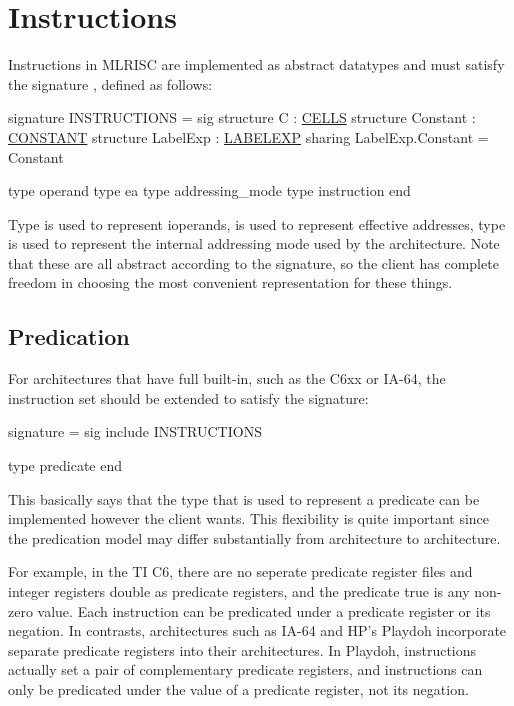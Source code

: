 \section{Instructions}

  Instructions in MLRISC are implemented as abstract datatypes and
must satisfy the signature 
, defined as follows:

\begin{SML}
signature INSTRUCTIONS =
sig
   structure C        : \href{cells.html}{CELLS}
   structure Constant : \href{constants.html}{CONSTANT}
   structure LabelExp : \href{labelexp.html}{LABELEXP}
      sharing LabelExp.Constant = Constant

   type operand   
   type ea         
   type addressing_mode
   type instruction 
end
\end{SML}

Type  is used to represent ioperands,
 is used to represent effective addresses, type 
 is used to represent the internal addressing mode
used by the architecture.  Note that these are all abstract according to 
the signature, so the client has complete freedom in choosing the most
convenient representation for these things.

\subsection{Predication}
   For architectures that have full 
built-in, such as the C6xx or IA-64, the instruction set should be
extended to satisfy the signature: 
\begin{SML}
signature  =
sig
   include INSTRUCTIONS
   
   type predicate  
end
\end{SML}
This basically says that the type that is used to represent a predicate
can be implemented however the client wants.  This flexibility
is quite important since the predication model may differ substantially
from architecture to architecture.

For example, in the TI C6, there are no seperate predicate register files
and integer registers double as predicate registers, and the predicate
true is any non-zero value.  Each instruction can be predicated under a
predicate register or its negation.  In contrasts, architectures such as
IA-64 and HP's Playdoh incorporate separate predicate registers into their 
architectures.  In Playdoh,  instructions 
actually set a pair of complementary predicate registers, 
and instructions can only
be predicated under the value of a predicate register, not its negation.

